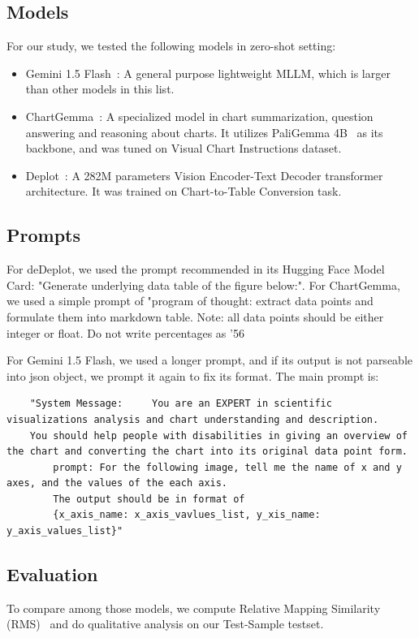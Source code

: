 \documentclass[
	letterpaper, %
]{jdf}
\begin{document}
\subsection{Models}\label{ssect:models}
For our study, we tested the following models in zero-shot setting:
\begin{itemize}
  \item Gemini 1.5 Flash~\cite{team2024gemini}: A general purpose lightweight MLLM, which is larger than other models in this list.
     \item ChartGemma~\cite{masry2024chartgemma}: A specialized model in chart summarization, question answering and reasoning about charts.
       It utilizes PaliGemma 4B~\cite{beyer2024paligemma} as its backbone, and was tuned on Visual Chart Instructions dataset.
     \item Deplot~\cite{liu2022deplot}: A 282M parameters Vision Encoder-Text Decoder transformer architecture.
         It was trained on Chart-to-Table Conversion task.
       \end{itemize}
       \subsection{Prompts}\label{ssect:prompts}
       For deDeplot, we used the prompt recommended in its Hugging Face Model Card: "Generate underlying data table of the figure below:".
       For ChartGemma, we used a simple prompt of "program of thought: extract data points and formulate them into markdown table.
    Note: all data points should be either integer or float.
    Do not write percentages as '56%

    For Gemini 1.5 Flash, we used a longer prompt, and if its output is not parseable into json object, we prompt it again to fix its format.
    The main prompt is: 
\begin{verbatim}
    "System Message:     You are an EXPERT in scientific visualizations analysis and chart understanding and description.
    You should help people with disabilities in giving an overview of the chart and converting the chart into its original data point form.
        prompt: For the following image, tell me the name of x and y axes, and the values of the each axis.
        The output should be in format of 
        {x_axis_name: x_axis_vavlues_list, y_xis_name: y_axis_values_list}"
        \end{verbatim}

\subsection{Evaluation}\label{ssect:method-eval}
To compare among those models, we compute Relative Mapping Similarity (RMS)~\cite{liu2022deplot} and do qualitative analysis on our Test-Sample testset.
\end{document}
